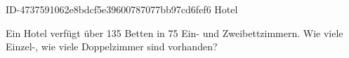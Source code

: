 \begin{exercise}
      {ID-4737591062e8bdcf5e39600787077bb97cd6fef6}
      {Hotel}
  \ifproblem\problem\par
    Ein Hotel verfügt über 135 Betten in 75 Ein- und Zweibettzimmern. Wie viele
    Einzel-, wie viele Doppelzimmer sind vorhanden?
  \fi
\end{exercise}
